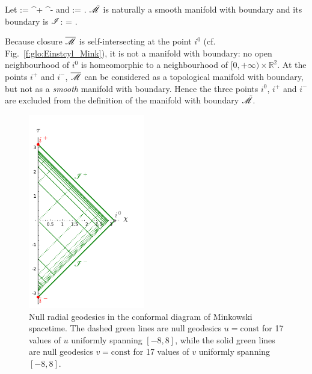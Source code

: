 Let
\be
    \scri := \scri^+ \cup \scri^-
\ee
and
\be
    \tilde{\M} := \M \cup \scri .
\ee
$\tilde{\mathscr{M}}$ is naturally a smooth manifold with boundary
and its boundary is $\mathscr{I}$:
\be
    \partial \tilde{\M} = \scri.
\ee
\begin{remark}
Because closure $\overline{\mathscr{M}}$ is self-intersecting at the point $i^0$
(cf. Fig.~\ref{f:glo:Einstcyl_Mink}), it is not a manifold with boundary: no open neighbourhood of
$i^0$ is homeomorphic to a neighbourhood of $[0,+\infty)\times \mathbb{R}^2$.
At the points $i^+$ and $i^-$, $\overline{\mathscr{M}}$ can be considered as a
topological manifold with boundary, but not as a \emph{smooth} manifold with boundary.
Hence the three points $i^0$, $i^+$ and $i^-$ are excluded from the definition
of the manifold with boundary $\tilde{\mathscr{M}}$.
\end{remark}

\begin{figure}
\centerline{\includegraphics[width=0.45\textwidth]{glo_conf_Mink_null.pdf}}
\caption[]{\label{f:glo:conf_Mink_null}\footnotesize
Null radial geodesics in the conformal diagram of Minkowski spacetime.
The dashed green lines are null geodesics $u=\mathrm{const}$ for
17 values of $u$ uniformly spanning $[-8,8]$, while the solid green lines are
null geodesics $v=\mathrm{const}$ for 17 values of $v$ uniformly spanning $[-8,8]$.}
\end{figure}

